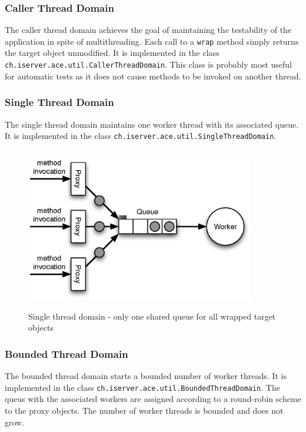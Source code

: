 \subsubsection{Caller Thread Domain}
The caller thread domain achieves the goal of maintaining the testability
of the application in spite of multithreading. Each call to a
\texttt{wrap} method simply returns the target object unmodified. It
is implemented in the class \texttt{ch.iserver.ace.util.CallerThreadDomain}.
This class is probably most useful for automatic tests as it does not cause
methods to be invoked on another thread.

\subsubsection{Single Thread Domain}
The single thread domain maintains one worker thread with its associated
queue. It is implemented in the class
\texttt{ch.iserver.ace.util.SingleThreadDomain}.

\begin{figure}[H]
 \centering
 \includegraphics[width=10cm,height=7.1cm]{../images/finalreport/threaddomain_single.eps}
 \caption{Single thread domain - only one shared queue for all wrapped target objects}
\end{figure}

\subsubsection{Bounded Thread Domain}
The bounded thread domain starts a bounded number of worker threads. It
is implemented in the class \texttt{ch.iserver.ace.util.BoundedThreadDomain}.
The queus with the associated workers are assigned according to
a round-robin scheme to the proxy objects. The number of worker threads
is bounded and does not grow.

